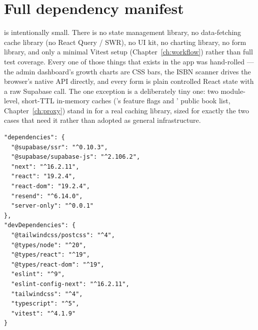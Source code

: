 \section{Full dependency manifest}

 is intentionally small. There is no state management library, no data-fetching cache library (no React Query / SWR), no UI kit, no charting library, no form library, and only a minimal Vitest setup (Chapter~\ref{ch:workflow}) rather than full test coverage. Every one of those things that exists in the app was hand-rolled — the admin dashboard's growth charts are CSS bars, the ISBN scanner drives the browser's native  API directly, and every form is plain controlled React state with a raw Supabase call. The one exception is a deliberately tiny one: two module-level, short-TTL in-memory caches ('s feature flags and ' public book list, Chapter~\ref{ch:proxy}) stand in for a real caching library, sized for exactly the two cases that need it rather than adopted as general infrastructure.

\begin{lstlisting}[caption={\pathname{package.json} — dependencies}]
"dependencies": {
  "@supabase/ssr": "^0.10.3",
  "@supabase/supabase-js": "^2.106.2",
  "next": "^16.2.11",
  "react": "19.2.4",
  "react-dom": "19.2.4",
  "resend": "^6.14.0",
  "server-only": "^0.0.1"
},
"devDependencies": {
  "@tailwindcss/postcss": "^4",
  "@types/node": "^20",
  "@types/react": "^19",
  "@types/react-dom": "^19",
  "eslint": "^9",
  "eslint-config-next": "^16.2.11",
  "tailwindcss": "^4",
  "typescript": "^5",
  "vitest": "^4.1.9"
}
\end{lstlisting}

